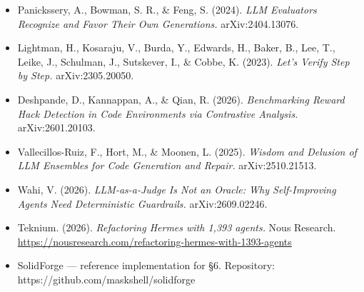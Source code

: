 \documentclass[
  11pt,
]{article}
\begin{document}
\begin{itemize}
\item
  Panickssery, A., Bowman, S. R., \& Feng, S. (2024). \emph{LLM
  Evaluators Recognize and Favor Their Own Generations.}
  arXiv:2404.13076.
\item
  Lightman, H., Kosaraju, V., Burda, Y., Edwards, H., Baker, B., Lee,
  T., Leike, J., Schulman, J., Sutskever, I., \& Cobbe, K. (2023).
  \emph{Let's Verify Step by Step.} arXiv:2305.20050.
\item
  Deshpande, D., Kannappan, A., \& Qian, R. (2026). \emph{Benchmarking
  Reward Hack Detection in Code Environments via Contrastive Analysis.}
  arXiv:2601.20103.
\item
  Vallecillos-Ruiz, F., Hort, M., \& Moonen, L. (2025). \emph{Wisdom and
  Delusion of LLM Ensembles for Code Generation and Repair.}
  arXiv:2510.21513.
\item
  Wahi, V. (2026). \emph{LLM-as-a-Judge Is Not an Oracle: Why
  Self-Improving Agents Need Deterministic Guardrails.}
  arXiv:2609.02246.
\item
  Teknium. (2026). \emph{Refactoring Hermes with 1,393 agents.} Nous
  Research.
  \url{https://nousresearch.com/refactoring-hermes-with-1393-agents}
\item
  SolidForge --- reference implementation for §6. Repository:
  https://github.com/maskshell/solidforge
\end{itemize}
\end{document}

